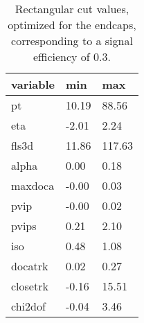 \begin{table} 
\begin{tabular}{l|ll} 
\hline 
variable & min & max \\ 
\hline 
pt	 & 10.19 & 88.56 \\ 
eta	 & -2.01 &  2.24 \\ 
fls3d	 & 11.86 & 117.63 \\ 
alpha	 &  0.00 &  0.18 \\ 
maxdoca	 & -0.00 &  0.03 \\ 
pvip	 & -0.00 &  0.02 \\ 
pvips	 &  0.21 &  2.10 \\ 
iso	 &  0.48 &  1.08 \\ 
docatrk	 &  0.02 &  0.27 \\ 
closetrk	 & -0.16 & 15.51 \\ 
chi2dof	 & -0.04 &  3.46 \\ 
\hline 
\end{tabular} 
\label{tab:cuts_endcaps} 
\caption{Rectangular cut values, optimized for the {\sc endcaps}, corresponding to a signal efficiency of 0.3.}
\end{table} 
